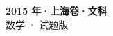 \documentclass[zihao=-4, a4paper]{ctexart}
\begin{document}
\begin{center}
  {\Large\bfseries 2015 年·上海卷·文科}\\[4pt]
  {\large 数学 · 试题版}
\end{center}
\medskip
{}

\end{document}
